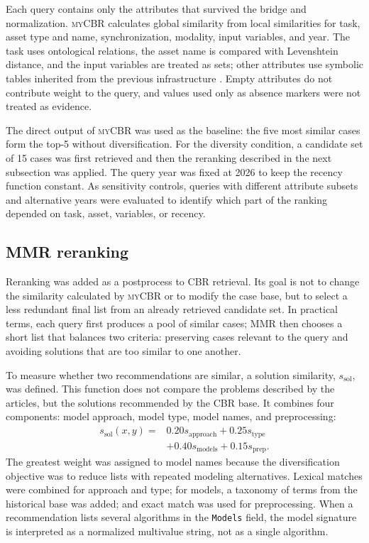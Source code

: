 \documentclass[journal]{IEEEtran}
\newcommand{\myCBR}{\textsc{myCBR}}
\begin{document}
Each query contains only the attributes that survived the bridge and normalization. \myCBR{} calculates global similarity from local similarities for task, asset type and name, synchronization, modality, input variables, and year. The task uses ontological relations, the asset name is compared with Levenshtein distance, and the input variables are treated as sets; other attributes use symbolic tables inherited from the previous infrastructure \cite{Sanchez2012SemanticSimilarity,MonteroJimenez2021OPMADCBR}. Empty attributes do not contribute weight to the query, and values used only as absence markers were not treated as evidence.

The direct output of \myCBR{} was used as the baseline: the five most similar cases form the top-5 without diversification. For the diversity condition, a candidate set of 15 cases was first retrieved and then the reranking described in the next subsection was applied. The query year was fixed at 2026 to keep the recency function constant. As sensitivity controls, queries with different attribute subsets and alternative years were evaluated to identify which part of the ranking depended on task, asset, variables, or recency.

\subsection{MMR reranking}
\label{sec:mmr}

Reranking was added as a postprocess to CBR retrieval. Its goal is not to change the similarity calculated by \myCBR{} or to modify the case base, but to select a less redundant final list from an already retrieved candidate set. In practical terms, each query first produces a pool of similar cases; MMR then chooses a short list that balances two criteria: preserving cases relevant to the query and avoiding solutions that are too similar to one another.

To measure whether two recommendations are similar, a solution similarity, $s_{\mathrm{sol}}$, was defined. This function does not compare the problems described by the articles, but the solutions recommended by the CBR base. It combines four components: model approach, model type, model names, and preprocessing:
\begin{equation}
\begin{split}
 s_{\mathrm{sol}}(x,y)={}&0.20s_{\mathrm{approach}}+0.25s_{\mathrm{type}}\\
 &+0.40s_{\mathrm{models}}+0.15s_{\mathrm{prep}}.
\end{split}
 \label{eq:solution-sim}
\end{equation}
The greatest weight was assigned to model names because the diversification objective was to reduce lists with repeated modeling alternatives. Lexical matches were combined for approach and type; for models, a taxonomy of terms from the historical base was added; and exact match was used for preprocessing. When a recommendation lists several algorithms in the \texttt{Models} field, the model signature is interpreted as a normalized multivalue string, not as a single algorithm.
\end{document}

